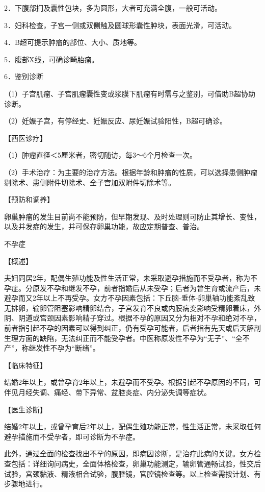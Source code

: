\documentclass[12pt,UTF8,openany]{ctexbook}
\begin{document}
2．下腹部扪及囊性包块，多为圆形，大者可充满全腹，一般可活动。

3．妇科检查，子宫一侧或双侧触及圆球形囊性肿块，表面光滑，可活动。

4．B超可提示肿瘤的部位、大小、质地等。

5．腹部X线，可确诊畸胎瘤。

6．鉴别诊断

（1）子宫肌瘤、子宫肌瘤囊性变或浆膜下肌瘤有时需与之鉴别，可借助B超协助诊断。

（2）妊娠子宫，有停经史、妊娠反应、尿妊娠试验阳性，B超可确诊。

【西医诊疗】

（1）肿瘤直径＜5厘米者，密切随访，每3～6个月检查一次。

（2）手术治疗：为主要的治疗方法。根据年龄和肿瘤的性质，可以选择患侧肿瘤剔除术、患侧附件切除术、全子宫加双附件切除术等。

【预防和调养】

卵巢肿瘤的发生目前尚不能预防，但早期发现、及时处理则可防止其增长、变性，以及并发症的发生，并可保存卵巢功能，故应定期普查、普治。





不孕症


【概述】

夫妇同居2年，配偶生殖功能及性生活正常，未采取避孕措施而不受孕者，称为不孕症。分原发不孕和继发不孕，前者指婚后从未受孕；后者为曾生育或流产后，未避孕而又2年以上不再受孕。女方不孕因素包括：下丘脑-垂体-卵巢轴功能紊乱致无排卵，输卵管阻塞影响精卵结合，子宫发育不良或内膜病变影响受精卵着床，外阴、阴道或宫颈因素影响精子穿过。根据不孕的原因又分为相对不孕和绝对不孕，前者指引起不孕的因素可以得到纠正，仍有受孕可能者，后者指有先天或后天解剖生理方面的缺陷，无法纠正而不能受孕者。中医称原发性不孕为“无子”、“全不产”，称继发性不孕为“断绪”。

【临床特征】

结婚2年以上，或曾孕育2年以上，未避孕而不受孕。根据引起不孕原因的不同，可伴见月经失调、痛经、带下异常、盆腔炎症、内分泌失调等症状。

【医生诊断】

结婚2年以上，或曾孕育后2年以上，配偶生殖功能正常，性生活正常，未采取任何避孕措施而不受孕者，即可诊断为不孕症。

此外，通过全面的检查找出不孕的原因，即病因诊断，是治疗此病的关键。女方检查包括：详细询问病史，全面体格检查，卵巢功能测定，输卵管通畅试验，性交后试验，宫颈黏液、精液相合试验，腹腔镜，官腔镜检查等。以上检查需按计划、有步骤地进行。
\end{document}
